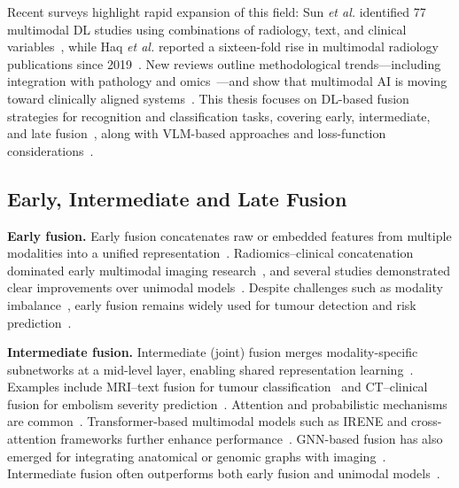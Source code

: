 Recent surveys highlight rapid expansion of this field: Sun \textit{et al.} identified 77 multimodal DL studies using combinations of radiology, text, and clinical variables~\cite{sun2023scoping}, while Haq \textit{et al.} reported a sixteen-fold rise in multimodal radiology publications since 2019~\cite{haq2025mmml}. New reviews outline methodological trends—including integration with pathology and omics~\cite{Tariq2025,li2024review,simon2025multimodal}—and show that multimodal AI is moving toward clinically aligned systems~\cite{huang2020fusion,kline2022multimodal}. This thesis focuses on DL-based fusion strategies for recognition and classification tasks, covering early, intermediate, and late fusion~\cite{mohsen2022artificial,stahlschmidt2022}, along with VLM-based approaches and loss-function considerations~\cite{huang2020fusion,kline2022multimodal,li2024review}.

\subsection{Early, Intermediate and Late Fusion}

\textbf{Early fusion.} Early fusion concatenates raw or embedded features from multiple modalities into a unified representation~\cite{stahlschmidt2022,mohsen2022artificial}. Radiomics–clinical concatenation dominated early multimodal imaging research~\cite{mohsen2022artificial}, and several studies demonstrated clear improvements over unimodal models~\cite{huang2020fusion,kharazmi2018feature,yap2018multimodal}. Despite challenges such as modality imbalance~\cite{mohsen2022artificial}, early fusion remains widely used for tumour detection and risk prediction~\cite{yala2019deep,sun2025deep,xiao2025novel,hsu2021deep}.

\textbf{Intermediate fusion.} Intermediate (joint) fusion merges modality-specific subnetworks at a mid-level layer, enabling shared representation learning~\cite{mohsen2022artificial}. Examples include MRI–text fusion for tumour classification~\cite{he2021deep} and CT–clinical fusion for embolism severity prediction~\cite{grant2021deep}. Attention and probabilistic mechanisms are common~\cite{samak2020prediction,liu2022machine,kawahara2018seven}. Transformer-based multimodal models such as IRENE and cross-attention frameworks further enhance performance~\cite{khader2023multimodal,zhou2023transformer,khader2023medical}. GNN-based fusion has also emerged for integrating anatomical or genomic graphs with imaging~\cite{simon2025multimodal}. Intermediate fusion often outperforms both early fusion and unimodal models~\cite{mohsen2022artificial}.

